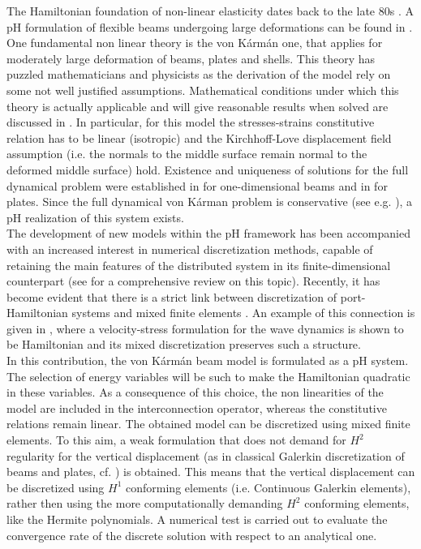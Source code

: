\documentclass{ifacconf}
\begin{document}
The Hamiltonian foundation of non-linear elasticity dates back to the late 80s \citep{simo1988}. A pH formulation of flexible beams undergoing large deformations can be found in \cite{macchelli2007fl,macchelli2009flrig}. One fundamental non linear theory is the von K\'arm\'an one, that applies for moderately large deformation of beams, plates and shells. This theory has puzzled mathematicians and physicists as the derivation of the model rely on some not well justified assumptions. Mathematical conditions under which this theory is actually applicable and will give reasonable results when solved are discussed in \cite{ciarlet1980,ciarlet1990}. In particular, for this model the stresses-strains constitutive relation has to be linear (isotropic) and the Kirchhoff-Love displacement field assumption (i.e. the normals to the middle surface remain normal to the deformed middle surface) hold. Existence and uniqueness of solutions for the full dynamical problem were established in \cite{lagnese1991uniform} for one-dimensional beams and in \cite{puel1996} for plates. Since the full dynamical von K\'arman problem is conservative (see e.g. \cite{bilbao2015conservative}), a pH realization of this system exists. \\

The development of new models within the pH framework has been accompanied with an increased interest in numerical discretization methods, capable of retaining the main features of the distributed system in its finite-dimensional counterpart (see \cite{rashad2020review} for a comprehensive review on this topic). Recently, it has become evident that there is a strict link between  discretization of port-Hamiltonian  systems and mixed finite elements \citep{cardoso2020pfem}. An example of this connection is given in \cite{kirby2015}, where a velocity-stress formulation for the wave dynamics is shown to be Hamiltonian and its mixed discretization preserves such a structure. \\

In this contribution, the von K\'arm\'an beam model is formulated as a pH system. The selection of energy variables will be such to make the Hamiltonian quadratic in these variables. As a consequence of this choice, the non linearities of the model are included in the interconnection operator, whereas the constitutive relations remain linear. The obtained model can be discretized using mixed finite elements. To this aim, a weak formulation that does not demand for $H^2$ regularity for the vertical displacement (as in classical Galerkin discretization of beams and plates, cf. \cite{gustafsson2018}) is obtained. This means that the vertical displacement can be discretized using $H^1$ conforming elements (i.e. Continuous Galerkin elements), rather then using the more computationally demanding $H^2$ conforming elements, like the Hermite polynomials. A numerical test is carried out to evaluate the convergence rate of the discrete solution with respect to an analytical one. \\
\end{document}
